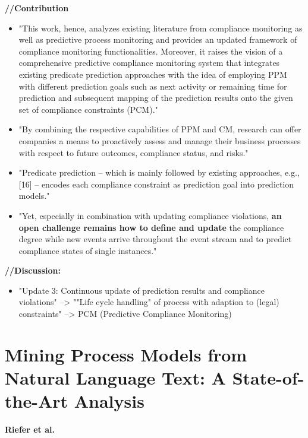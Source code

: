 \textbf{//Contribution}
\begin{itemize}
\item "This work, hence, analyzes existing literature from compliance monitoring as well as predictive process monitoring and provides an updated framework of compliance monitoring functionalities. Moreover, it raises the vision of a comprehensive predictive compliance monitoring system that integrates existing predicate prediction approaches with the idea of employing PPM with different prediction goals such as next activity or remaining time for prediction and subsequent mapping of the prediction results onto the given set of compliance constraints (PCM)."
\item "By combining the respective capabilities of PPM and CM, research can offer companies a means to proactively assess and manage their business processes with respect to future outcomes, compliance status, and risks."
\item "Predicate prediction – which is mainly followed by existing approaches, e.g., [16] – encodes each compliance constraint as prediction goal into prediction models."
\item "Yet, especially in combination with updating compliance violations,\textbf{ an open challenge remains how to define and update }the compliance degree while new events arrive throughout the event stream and to predict compliance states of single instances."
\end{itemize}

\textbf{//Discussion:}
\begin{itemize}
\item "Update 3: Continuous update of prediction results and compliance violations" --> ""Life cycle handling" of process with adaption to (legal) constraints" --> PCM (Predictive Compliance Monitoring)
\end{itemize}

\section{Mining Process Models from Natural Language Text: A State-of-the-Art Analysis}
\textbf{Riefer et al.} \cite{rieferMiningProcessModels2016a}

